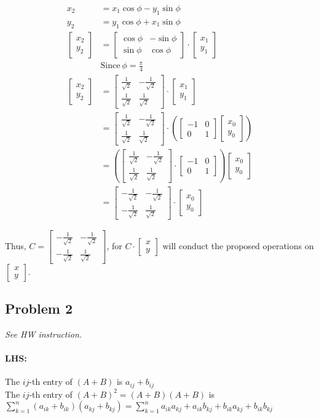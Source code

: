 \documentclass[11pt]{article}
\providecommand{\qbm}[1]{\begin{bmatrix} #1 \end{bmatrix}}
\begin{document}
\begin{align*}
    x_2 &= x_1 \cos \phi - y_1 \sin \phi \\
    y_2 &= y_1 \cos \phi + x_1 \sin \phi \\
    \qbm{x_2 \\ y_2} &= \qbm{\cos \phi & -\sin \phi \\ \sin \phi & \cos \phi} \cdot \qbm{x_1 \\ y_1} \\
    &\text{Since}\ \phi = \frac{\pi}{4} \\
    \qbm{x_2 \\ y_2} &= \qbm{\frac{1}{\sqrt{2}} & -\frac{1}{\sqrt{2}}  \\ \frac{1}{\sqrt{2}}  & \frac{1}{\sqrt{2}} } \cdot \qbm{x_1 \\ y_1} \\
    &= \qbm{\frac{1}{\sqrt{2}} & -\frac{1}{\sqrt{2}}  \\ \frac{1}{\sqrt{2}}  & \frac{1}{\sqrt{2}} } \cdot (\qbm{-1 & 0 \\ 0 & 1} \qbm{x_0 \\ y_0}) \\
    &= (\qbm{\frac{1}{\sqrt{2}} & -\frac{1}{\sqrt{2}}  \\ \frac{1}{\sqrt{2}}  & \frac{1}{\sqrt{2}} } \cdot \qbm{-1 & 0 \\ 0 & 1}) \qbm{x_0 \\ y_0} \\
    &= \qbm{-\frac{1}{\sqrt{2}} & -\frac{1}{\sqrt{2}} \\ -\frac{1}{\sqrt{2}} & \frac{1}{\sqrt{2}}} \cdot \qbm{x_0 \\ y_0}
\end{align*}

Thus, $C = \qbm{-\frac{1}{\sqrt{2}} & -\frac{1}{\sqrt{2}} \\ -\frac{1}{\sqrt{2}} & \frac{1}{\sqrt{2}}}$, for $C \cdot \qbm{x \\ y}$ will conduct the proposed operations on $\qbm{x \\ y}$.

\subsection*{Problem 2}
\textit{See HW instruction.}\newline

\paragraph*{LHS:}
The $ij$-th entry of $(A+B) $ is $a_{ij}+b_{ij}$\\
The $ij$-th entry of $(A+B)^2 = (A+B)(A+B)$ is $\sum_{k=1}^n (a_{ik}+b_{ik})(a_{kj}+b_{kj})= \sum_{k=1}^n a_{ik}a_{kj}+a_{ik}b_{kj}+b_{ik}a_{kj}+b_{ik}b_{kj}$
\end{document}

